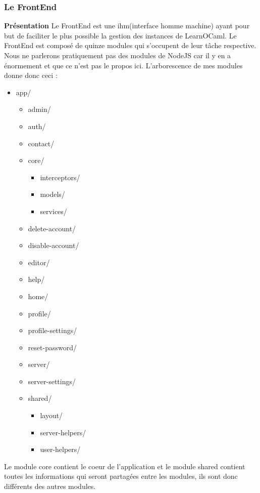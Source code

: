 \documentclass{article}
\begin{document}
\subsubsection{Le FrontEnd}
\textbf{Présentation}
\newline
\newline
Le FrontEnd est une ihm(interface homme machine) ayant pour but de faciliter le plus possible la gestion des instances de LearnOCaml.
\newline
Le FrontEnd est composé de quinze modules qui s'occupent de leur tâche respective. Nous ne parlerons pratiquement pas des modules de NodeJS car il y en a énormement et que ce n'est pas le propos ici.
\newline
L'arborescence de mes modules donne donc ceci :
\begin{itemize}
	\item[] app/
	\begin{itemize}
		\item[]admin/
		\item[]auth/
		\item[]contact/
		\item[]core/
		\begin{itemize}
			\item[]interceptors/
			\item[]models/
			\item[]services/
		\end{itemize}
		\item[]delete-account/
		\item[]disable-account/
		\item[]editor/
		\item[]help/
		\item[]home/
		\item[]profile/
		\item[]profile-settings/
		\item[]reset-password/
		\item[]server/
		\item[]server-settings/
		\item[]shared/
		\begin{itemize}
			\item[]layout/
			\item[]server-helpers/
			\item[]user-helpers/
		\end{itemize}
	\end{itemize}
\end{itemize}
Le module core contient le coeur de l'application et le module shared contient toutes les informations qui seront partagées entre les modules, ils sont donc différents des autres modules.
\end{document}
